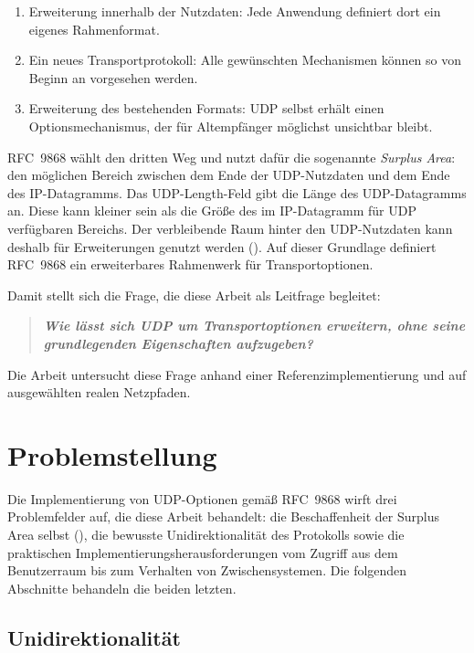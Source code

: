 \begin{enumerate}
    \item Erweiterung innerhalb der Nutzdaten: Jede Anwendung definiert dort ein eigenes Rahmenformat.
    \item Ein neues Transportprotokoll: Alle gewünschten Mechanismen können so von Beginn an vorgesehen werden.
    \item Erweiterung des bestehenden Formats: UDP selbst erhält einen Options\-mechanismus, der für
        Altempfänger möglichst unsichtbar bleibt.
\end{enumerate}

RFC~9868 wählt den dritten Weg und nutzt dafür die sogenannte \emph{Surplus Area}: den möglichen Bereich
zwischen dem Ende der UDP-Nutzdaten
und dem Ende des IP-Datagramms. Das UDP-Length-Feld gibt die Länge des UDP-Datagramms an. Diese kann
kleiner sein als die Größe des im IP-Datagramm für UDP verfügbaren Bereichs. Der verbleibende Raum hinter
den UDP-Nutzdaten kann deshalb für Erweiterungen genutzt werden ().
Auf dieser Grundlage definiert RFC~9868 ein erweiterbares Rahmenwerk für Transportoptionen.

Damit stellt sich die Frage, die diese Arbeit als Leitfrage begleitet:

\begin{quote}
    \textbf{\emph{Wie lässt sich UDP um Transportoptionen erweitern, ohne seine grundlegenden
    Eigenschaften aufzugeben?}}
\end{quote}

Die Arbeit untersucht diese Frage anhand einer Referenzimplementierung und auf ausgewählten realen Netzpfaden.


\section{Problemstellung}
\label{sec:problemstellung}

Die Implementierung von UDP-Optionen gemäß RFC~9868 wirft drei Problemfelder auf, die diese Arbeit behandelt:
die Beschaffenheit der Surplus Area selbst (), die bewusste Unidirektionalität des
Protokolls sowie die praktischen Implementierungsherausforderungen vom Zugriff aus dem Benutzerraum bis zum
Verhalten von Zwischensystemen. Die folgenden Abschnitte behandeln die beiden letzten.

\subsection{Unidirektionalität}

